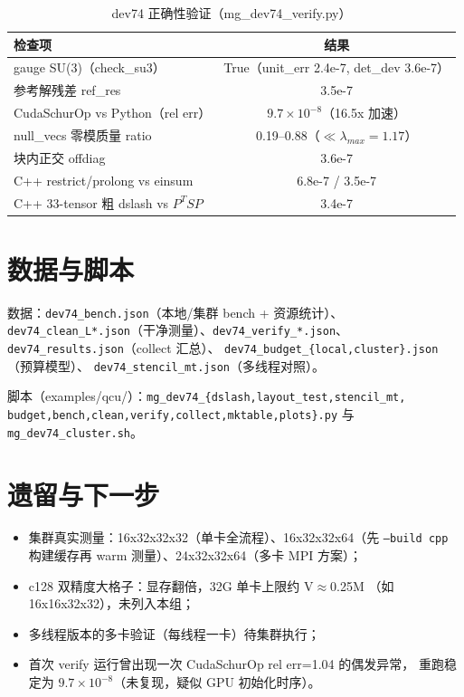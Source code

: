 \documentclass[11pt,a4paper]{article}
\begin{document}
\begin{table}[H]
  \centering
  \begin{tabular}{lc}
    \hline
    检查项 & 结果 \\
    \hline
    gauge SU(3)（check\_su3） & True（unit\_err 2.4e-7, det\_dev 3.6e-7） \\
    参考解残差 ref\_res & 3.5e-7 \\
    CudaSchurOp vs Python（rel err） & $9.7\times10^{-8}$（16.5x 加速） \\
    null\_vecs 零模质量 ratio & 0.19--0.88（$\ll\lambda_{max}=1.17$） \\
    块内正交 offdiag & 3.6e-7 \\
    C++ restrict/prolong vs einsum & 6.8e-7 / 3.5e-7 \\
    C++ 33-tensor 粗 dslash vs $P^TS P$ & 3.4e-7 \\
    \hline
  \end{tabular}
  \caption{dev74 正确性验证（mg\_dev74\_verify.py）}
\end{table}

\section{数据与脚本}
\label{sec:files}

数据：\texttt{dev74\_bench.json}（本地/集群 bench + 资源统计）、
\texttt{dev74\_clean\_L*.json}（干净测量）、\texttt{dev74\_verify\_*.json}、
\texttt{dev74\_results.json}（collect 汇总）、
\texttt{dev74\_budget\_\{local,cluster\}.json}（预算模型）、
\texttt{dev74\_stencil\_mt.json}（多线程对照）。

脚本（examples/qcu/）：\texttt{mg\_dev74\_\{dslash,layout\_test,stencil\_mt,
budget,bench,clean,verify,collect,mktable,plots\}.py} 与
\texttt{mg\_dev74\_cluster.sh}。

\section{遗留与下一步}
\label{sec:todo}

\begin{itemize}
  \item 集群真实测量：16x32x32x32（单卡全流程）、16x32x32x64（先
    \texttt{--build cpp} 构建缓存再 warm 测量）、24x32x32x64（多卡 MPI 方案）；
  \item c128 双精度大格子：显存翻倍，32G 单卡上限约 V$\approx$0.25M
    （如 16x16x32x32），未列入本组；
  \item 多线程版本的多卡验证（每线程一卡）待集群执行；
  \item 首次 verify 运行曾出现一次 CudaSchurOp rel err=1.04 的偶发异常，
    重跑稳定为 $9.7\times10^{-8}$（未复现，疑似 GPU 初始化时序）。
\end{itemize}
\end{document}
